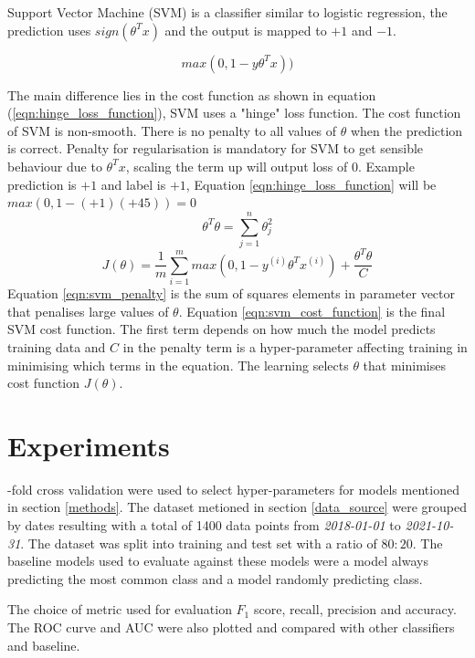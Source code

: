\documentclass[transmag]{IEEEtran}
\begin{document}
\noindent Support Vector Machine (SVM) is a classifier similar to logistic regression, the prediction uses $sign(\theta^Tx)$ and the output is mapped to $+1$ and $-1$. 

\begin{equation}
\label{eqn:hinge_loss_function}
max(0,1-y\theta^Tx))
\end{equation}

\noindent The main difference lies in the cost function as shown in equation (\ref{eqn:hinge_loss_function}), SVM uses a "hinge" loss function. The cost function of SVM is non-smooth. There is no penalty to all values of $\theta$ when the prediction is correct. Penalty for regularisation is mandatory for SVM to get sensible behaviour due to $\theta^Tx$, scaling the term up will output loss of 0. Example prediction is $+1$ and label is $+1$, Equation \ref{eqn:hinge_loss_function} will be $max(0, 1 - (+1)(+45)) = 0$
\begin{equation}
\label{eqn:svm_penalty}
\theta^T\theta = \sum^n_{j=1} \theta^2_j
\end{equation}
\begin{equation}
\label{eqn:svm_cost_function}
J(\theta) = \frac{1}{m}\sum^m_{i=1}max(0,1-y^{(i)}\theta^Tx^{(i)})+\frac{\theta^T\theta}{C}
\end{equation}
Equation \ref{eqn:svm_penalty} is the sum of squares elements in parameter vector that penalises large values of $\theta$. Equation \ref{eqn:svm_cost_function} is the final SVM cost function. The first term depends on how much the model predicts training data and $C$ in the penalty term is a hyper-parameter affecting training in minimising which terms in the equation. The learning selects $\theta$ that minimises cost function $J(\theta)$.


\section{Experiments}
-fold cross validation were used to select hyper-parameters for models mentioned in section \ref{methods}. The dataset metioned in section \ref{data_source} were grouped by dates resulting with a total of 1400 data points from \emph{2018-01-01} to \emph{2021-10-31}. The dataset was split into training and test set with a ratio of $80:20$. The baseline models used to evaluate against these models were a model always predicting the most common class and a model randomly predicting class.

\noindent The choice of metric used for evaluation $F_1$ score, recall, precision and accuracy. The ROC curve and AUC were also plotted and compared with other classifiers and baseline.
\end{document}
